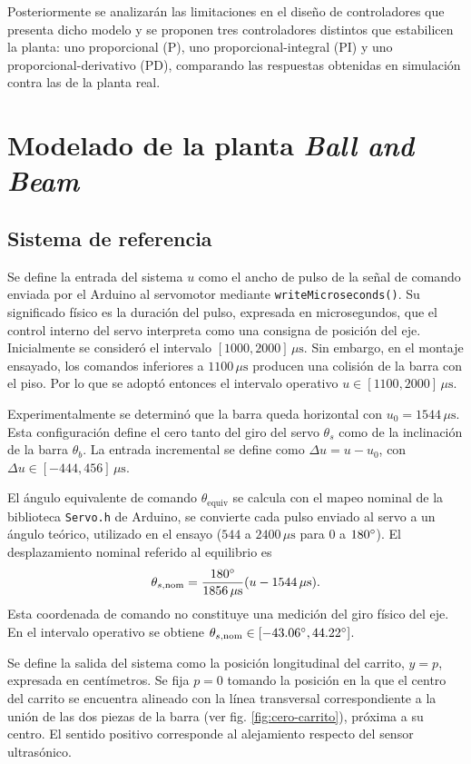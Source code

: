 \documentclass[a4paper, twoside, 10pt, spanish]{article}
\numberwithin{table}{section}
\begin{document}
    Posteriormente se analizarán las limitaciones en el diseño de controladores que presenta dicho modelo y se proponen tres controladores distintos que estabilicen la planta: uno proporcional (P), uno proporcional-integral (PI) y uno proporcional-derivativo (PD), comparando las respuestas obtenidas en simulación contra las de la planta real.

    \section{Modelado de la planta \textit{Ball and Beam}}
    \subsection{Sistema de referencia}
    Se define la entrada del sistema $u$ como el ancho de pulso de la señal de comando enviada por el Arduino al servomotor mediante \texttt{writeMicroseconds()}. Su significado físico es la duración del pulso, expresada en microsegundos, que el control interno del servo interpreta como una consigna de posición del eje. Inicialmente se consideró el intervalo $[1000,2000]\,\mu\text{s}$. Sin embargo, en el montaje ensayado, los comandos inferiores a $1100\,\mu\text{s}$ producen una colisión de la barra con el piso. Por lo que se adoptó entonces el intervalo operativo $u\in[1100,2000]\,\mu\text{s}$.

    Experimentalmente se determinó que la barra queda horizontal con $u_0=1544\,\mu\text{s}$. Esta configuración define el cero tanto del giro del servo $\theta_s$ como de la inclinación de la barra $\theta_b$. La entrada incremental se define como $\Delta u=u-u_0$, con $\Delta u\in[-444,456]\,\mu\text{s}$.

    El ángulo equivalente de comando $\theta_{\text{equiv}}$ se calcula con el mapeo nominal de la biblioteca \texttt{Servo.h} de Arduino, se convierte cada pulso enviado al servo a un ángulo teórico, utilizado en el ensayo ($544$ a $2400\,\mu\text{s}$ para $0$ a $180\degree$). El desplazamiento nominal referido al equilibrio es
    \[
    \theta_{s,\text{nom}}=\frac{180\degree}{1856\,\mu\text{s}}(u-1544\,\mu\text{s}).
    \]
    Esta coordenada de comando no constituye una medición del giro físico del eje. En el intervalo operativo se obtiene $\theta_{s,\text{nom}}\in[-43.06\degree,44.22\degree]$.

    Se define la salida del sistema como la posición longitudinal del carrito, $y=p$, expresada en centímetros. Se fija $p=0$ tomando la posición en la que el centro del carrito se encuentra alineado con la línea transversal correspondiente a la unión de las dos piezas de la barra (ver fig. \ref{fig:cero-carrito}), próxima a su centro. El sentido positivo corresponde al alejamiento respecto del sensor ultrasónico.
\end{document}
